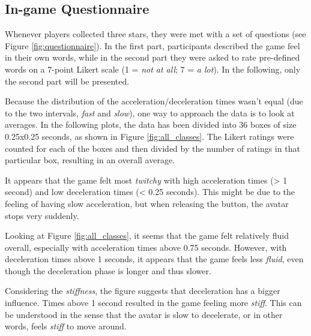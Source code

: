 
\subsection{In-game Questionnaire}

Whenever players collected three stars, they were met with a set of questions (see Figure \ref{fig:questionnaire}). In the first part, participants described the game feel in their own words, while in the second part they were asked to rate pre-defined words on a 7-point Likert scale (1 = \textit{not at all}; 7 = \textit{a lot}). In the following, only the second part will be presented.

Because the distribution of the acceleration/deceleration times wasn't equal (due to the two intervals, \textit{fast} and \textit{slow}), one way to approach the data is to look at averages. In the following plots, the data has been divided into 36 boxes of size 0.25x0.25 seconds, as shown in Figure \ref{fig:all_classes}. The Likert ratings were counted for each of the boxes and then divided by the number of ratings in that particular box, resulting in an overall average.

It appears that the game felt most \textit{twitchy} with high acceleration times (> 1 second) and low deceleration times (< 0.25 seconds). This might be due to the feeling of having slow acceleration, but when releasing the button, the avatar stops very suddenly.

Looking at Figure \ref{fig:all_classes}, it seems that the game felt relatively fluid overall, especially with acceleration times above 0.75 seconds. However, with deceleration times above 1 seconds, it appears that the game feels less \textit{fluid}, even though the deceleration phase is longer and thus slower.

Considering the \textit{stiffness}, the figure suggests that deceleration has a bigger influence. Times above 1 second resulted in the game feeling more \textit{stiff}. This can be understood in the sense that the avatar is slow to decelerate, or in other words, feels \textit{stiff} to move around.

